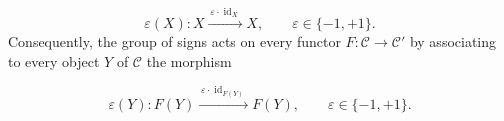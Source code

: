 \begin{equation}
  \varepsilon(X)\colon
  X\xrightarrow{\,\varepsilon\cdot\operatorname{id}_X\,}X,
  \qquad \varepsilon\in\{-1,+1\}.
  \tag{1.4.3.1}
\end{equation}
Consequently, the group of signs acts on every functor
$F\colon\mathcal C\to\mathcal C'$ by associating to every object $Y$
of $\mathcal C$ the morphism

\begin{equation}
  \varepsilon(Y)\colon
  F(Y)\xrightarrow{\,\varepsilon\cdot\operatorname{id}_{F(Y)}\,}F(Y),
  \qquad \varepsilon\in\{-1,+1\}.
  \tag{1.4.3.2}
\end{equation}
